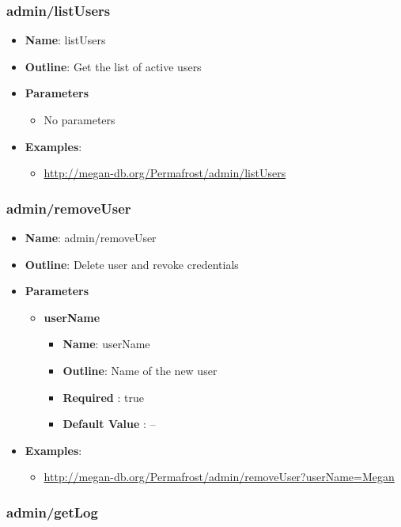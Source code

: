 \documentclass[11pt]{article}
\begin{document}
\subsubsection{admin/listUsers}
\label{subsubsec:userInterface}
\begin{itemize}
	\item \textbf{Name}: listUsers
	\item \textbf{Outline}: Get the list of active users
	\item \textbf{Parameters}
		\begin{itemize}
			\item No parameters
		\end{itemize}
	\item \textbf{Examples}:
		\begin{itemize}		
			\item \url{http://megan-db.org/Permafrost/admin/listUsers}
		\end{itemize}
\end{itemize}
\subsubsection{admin/removeUser}
\begin{itemize}
	\item \textbf{Name}: admin/removeUser
	\item \textbf{Outline}: Delete user and revoke credentials
	\item \textbf{Parameters}
		\begin{itemize}
			\item \textbf{userName}		
				\begin{itemize}
					\item \textbf{Name}: userName
					\item \textbf{Outline}: Name of the new user
					\item \textbf{Required} : true
					\item \textbf{Default Value} : --
				\end{itemize}
		\end{itemize}
	\item \textbf{Examples}:
		\begin{itemize}		
			\item \url{http://megan-db.org/Permafrost/admin/removeUser?userName=Megan}
		\end{itemize}
\end{itemize}
\subsubsection{admin/getLog}
\end{document}
